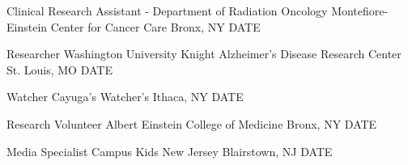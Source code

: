

\begin{cventries}

  \cventry
    {Clinical Research Assistant - Department of Radiation Oncology} %
    {Montefiore-Einstein Center for Cancer Care} %
    {Bronx, NY} %
    {DATE} %
    {
      \begin{cvitems} %
        \item {}
        \item {}
        \item {}
      \end{cvitems}
    }

  \cventry
    {Researcher} %
    {Washington University Knight Alzheimer's Disease Research Center} %
    {St. Louis, MO} %
    {DATE} %
    {
      \begin{cvitems} %
        \item {}
        \item {}
      \end{cvitems}
    }

  \cventry
    {Watcher} %
    {Cayuga's Watcher's} %
    {Ithaca, NY} %
    {DATE} %
    {
      \begin{cvitems} %
        \item {}
        \item {}
      \end{cvitems} 
    }

  \cventry
    {Research Volunteer} %
    {Albert Einstein College of Medicine} %
    {Bronx, NY} %
    {DATE} %
    {
      \begin{cvitems} %
        \item {}
      \end{cvitems}
    }

  \cventry
    {Media Specialist} %
    {Campus Kids New Jersey} %
    {Blairstown, NJ} %
    {DATE} %
    {
      \begin{cvitems} %
        \item {}
      \end{cvitems}
    }

\end{cventries}
